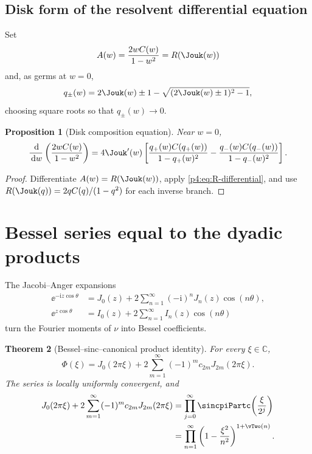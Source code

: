 \documentclass[11pt,oneside]{article}
\newtheorem{theorem}{Theorem}[section]
\newtheorem{proposition}[theorem]{Proposition}
\theoremstyle{definition}
\newcommand{\dd}{\,\mathrm d}
\newcommand{\ii}{\mathrm i}
\begin{document}
\subsection{Disk form of the resolvent differential equation}

Set
\begin{equation}
 A(w)=\frac{2wC(w)}{1-w^2}=R(\Jouk(w))
 \label{p4:eq:A-disk}
\end{equation}
and, as germs at \(w=0\),
\begin{equation}
 q_{\pm}(w)=2\Jouk(w)\pm1-
 \sqrt{(2\Jouk(w)\pm1)^2-1},
 \label{p4:eq:qpm}
\end{equation}
choosing square roots so that \(q_\pm(w)\to0\).

\begin{proposition}[Disk composition equation]
\label{p4:prop:disk-composition}
Near \(w=0\),
\begin{equation}
 \frac{\dd}{\dd w}\left(\frac{2wC(w)}{1-w^2}\right)
 =4\Jouk'(w)\left[
 \frac{q_+(w)C(q_+(w))}{1-q_+(w)^2}
 -\frac{q_-(w)C(q_-(w))}{1-q_-(w)^2}
 \right].
 \label{p4:eq:disk-composition}
\end{equation}
\end{proposition}

\begin{proof}
Differentiate \(A(w)=R(\Jouk(w))\), apply \eqref{p4:eq:R-differential}, and use
\(R(\Jouk(q))=2qC(q)/(1-q^2)\) for each inverse branch.
\end{proof}

\section{Bessel series equal to the dyadic products}
\label{p4:sec:bessel}

The Jacobi--Anger expansions
\begin{align}
 \ee^{-\ii z\cos\theta}
 &=J_0(z)+2\sum_{n=1}^{\infty}(-\ii)^nJ_n(z)\cos(n\theta),
 \label{p4:eq:JA-ordinary}\\
 \ee^{z\cos\theta}
 &=I_0(z)+2\sum_{n=1}^{\infty}I_n(z)\cos(n\theta)
 \label{p4:eq:JA-modified}
\end{align}
turn the Fourier moments of \(\nu\) into Bessel coefficients.

\begin{theorem}[Bessel--sinc--canonical product identity]
\label{p4:thm:Bessel-Phi}
For every \(\xi\in\mathbb C\),
\begin{equation}
 \boxed{\displaystyle
 \Phi(\xi)=J_0(2\pi\xi)
 +2\sum_{m=1}^{\infty}(-1)^m c_{2m}J_{2m}(2\pi\xi).}
 \label{p4:eq:Phi-Bessel}
\end{equation}
The series is locally uniformly convergent, and
\begin{align}
 J_0(2\pi\xi)+2\sum_{m=1}^{\infty}(-1)^mc_{2m}J_{2m}(2\pi\xi)
 &=\prod_{j=0}^{\infty}\sincpiPartc\!\left(\frac{\xi}{2^j}\right)
 \label{p4:eq:Bessel-sinc}\\
 &=\prod_{n=1}^{\infty}\left(1-\frac{\xi^2}{n^2}\right)^{1+\vTwo(n)}.
 \label{p4:eq:Bessel-canonical}
\end{align}
\end{theorem}
\end{document}
